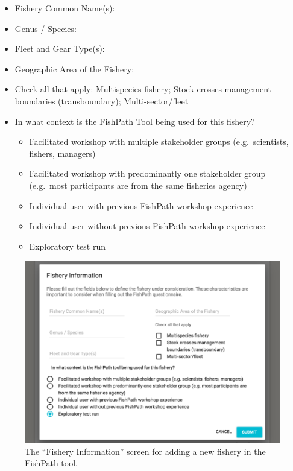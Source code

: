 \documentclass[11pt,]{book}
\providecommand{\tightlist}{%
  \setlength{\itemsep}{0pt}\setlength{\parskip}{0pt}}
\begin{document}
\begin{itemize}
\tightlist
\item
  Fishery Common Name(s):
\item
  Genus / Species:
\item
  Fleet and Gear Type(s):
\item
  Geographic Area of the Fishery:
\item
  Check all that apply: Multispecies fishery; Stock crosses management
  boundaries (transboundary); Multi-sector/fleet
\item
  In what context is the FishPath Tool being used for this fishery?

  \begin{itemize}
  \tightlist
  \item
    Facilitated workshop with multiple stakeholder groups
    (e.g.~scientists, fishers, managers)
  \item
    Facilitated workshop with predominantly one stakeholder group
    (e.g.~most participants are from the same fisheries agency)
  \item
    Individual user with previous FishPath workshop experience
  \item
    Individual user without previous FishPath workshop experience
  \item
    Exploratory test run
  \end{itemize}
\end{itemize}

\begin{figure}

{\centering \includegraphics[width=0.95\linewidth]{images/fishery-info-screen} 

}

\caption{The “Fishery Information” screen for adding a new fishery in the FishPath tool.}\label{fig:fishery-info}
\end{figure}
\end{document}

